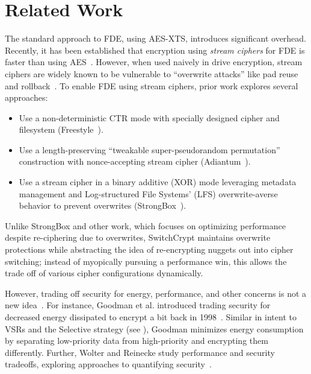 \section{Related Work}\label{sec:related}

The standard approach to FDE, using AES-XTS, introduces significant overhead.
Recently, it has been established that encryption using \emph{stream ciphers}
for FDE is faster than using AES~\cite{StrongBox, AnotherPaper1, AnotherPaper2}.
However, when used naively in drive encryption, stream ciphers are widely known
to be vulnerable to ``overwrite attacks'' like pad reuse and
rollback~\cite{KatzLindell, StrongBox}. To enable FDE using stream ciphers,
prior work explores several approaches:

\begin{itemize}
   \item Use a non-deterministic CTR mode with specially designed cipher and
   filesystem (Freestyle~\cite{Freestyle}).
   \item Use a length-preserving ``tweakable super-pseudorandom permutation''
   construction with nonce-accepting stream cipher (Adiantum~\cite{Adiantum}).
   \item Use a stream cipher in a binary additive (XOR) mode leveraging metadata
   management and Log-structured File Systems' (LFS) overwrite-averse behavior
   to prevent overwrites (StrongBox~\cite{StrongBox}).
\end{itemize}

Unlike StrongBox and other work, which focuses on optimizing performance despite
re-ciphering due to overwrites, SwitchCrypt maintains overwrite protections
while abstracting the idea of re-encrypting nuggets out into cipher switching;
instead of myopically pursuing a performance win, this allows the trade off of
various cipher configurations dynamically.

However, trading off security for energy, performance, and other concerns is not
a new idea~\cite{ScalableSecurity, WolterReinecke, ZengChow1, ZengChow2,
HaleemEtAl, LiOmiecinski}. For instance, Goodman et al. introduced trading
security for decreased energy dissipated to encrypt a bit back in
1998~\cite{ScalableSecurity}. Similar in intent to VSRs and the Selective
strategy (see ), Goodman minimizes energy consumption by
separating low-priority data from high-priority and encrypting them differently. 
Further, Wolter and Reinecke study performance and security tradeoffs, exploring
approaches to quantifying security~\cite{WolterReinecke}. 

